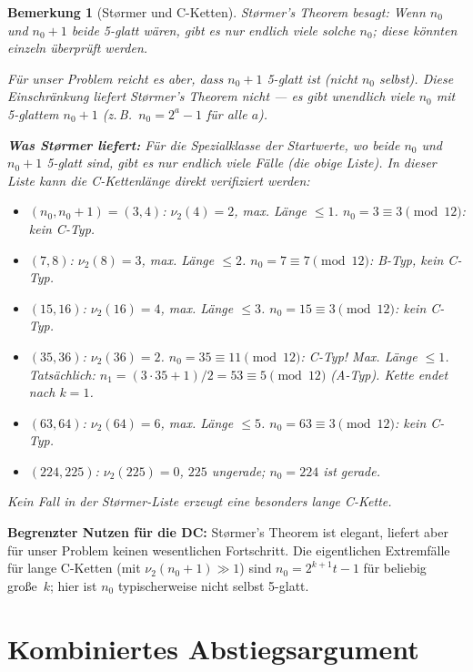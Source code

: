 \documentclass[12pt,a4paper]{article}
\newtheorem{bemerkung}[definition]{Bemerkung}
\newcommand{\vii}{\nu_2}
\begin{document}
	\begin{bemerkung}[Størmer und C-Ketten]
		\label{bem:stoermer}
		Størmer's Theorem besagt: Wenn $n_0$ \emph{und} $n_0+1$ beide 5-glatt wären,
		gibt es nur endlich viele solche $n_0$; diese könnten einzeln überprüft werden.
		
		Für unser Problem reicht es aber, dass $n_0+1$ 5-glatt ist (nicht $n_0$ selbst).
		Diese Einschränkung liefert Størmer's Theorem nicht --- es gibt unendlich
		viele $n_0$ mit 5-glattem $n_0+1$ (z.\,B.\ $n_0 = 2^a - 1$ für alle $a$).
		
		\textbf{Was Størmer liefert:} Für die Spezialklasse der Startwerte, wo
		\emph{beide} $n_0$ und $n_0+1$ 5-glatt sind, gibt es nur endlich viele
		Fälle (die obige Liste). In dieser Liste kann die C-Kettenlänge direkt
		verifiziert werden:
		\begin{itemize}
			\item $(n_0, n_0+1) = (3, 4)$: $\vii(4) = 2$, max. Länge $\leq 1$. $n_0 = 3 \equiv 3 \pmod{12}$: kein C-Typ.
			\item $(7, 8)$: $\vii(8) = 3$, max. Länge $\leq 2$. $n_0 = 7 \equiv 7 \pmod{12}$: B-Typ, kein C-Typ.
			\item $(15, 16)$: $\vii(16) = 4$, max. Länge $\leq 3$. $n_0 = 15 \equiv 3 \pmod{12}$: kein C-Typ.
			\item $(35, 36)$: $\vii(36) = 2$. $n_0 = 35 \equiv 11 \pmod{12}$: C-Typ! Max. Länge $\leq 1$. Tatsächlich: $n_1 = (3\cdot35+1)/2 = 53 \equiv 5 \pmod{12}$ (A-Typ). Kette endet nach $k=1$. \checkmark
			\item $(63, 64)$: $\vii(64) = 6$, max. Länge $\leq 5$. $n_0 = 63 \equiv 3 \pmod{12}$: kein C-Typ.
			\item $(224, 225)$: $\vii(225) = 0$, $225$ ungerade; $n_0 = 224$ ist gerade.
		\end{itemize}
		Kein Fall in der Størmer-Liste erzeugt eine besonders lange C-Kette.
	\end{bemerkung}
	
	\begin{tcolorbox}[warnung]
		\textbf{Begrenzter Nutzen für die DC:}
		Størmer's Theorem ist elegant, liefert aber für unser Problem keinen
		wesentlichen Fortschritt. Die eigentlichen Extremfälle für lange C-Ketten
		(mit $\vii(n_0+1) \gg 1$) sind $n_0 = 2^{k+1}t - 1$ für beliebig große~$k$;
		hier ist $n_0$ typischerweise nicht selbst 5-glatt.
	\end{tcolorbox}
	
	\section{Kombiniertes Abstiegsargument}
	\label{sec:abstieg}
	
\end{document}
